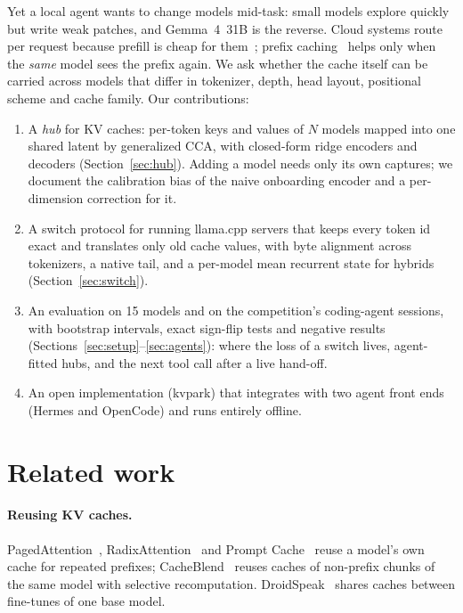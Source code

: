 \documentclass[11pt]{article}
\begin{document}
Yet a local agent wants to change models mid-task: small models explore quickly but write weak patches,
and Gemma~4~31B is the reverse. Cloud systems route per request because prefill is cheap for
them~\citep{chen2023frugalgpt,ong2024routellm}; prefix
caching~\citep{kwon2023vllm,zheng2024sglang,gim2024promptcache} helps only when the \emph{same} model sees
the prefix again. We ask whether the cache itself can be carried across models that differ in tokenizer,
depth, head layout, positional scheme and cache family. Our contributions:
\begin{enumerate}
\item A \emph{hub} for KV caches: per-token keys and values of $N$ models mapped into one
  shared latent by generalized CCA, with closed-form ridge encoders and decoders
  (Section~\ref{sec:hub}). Adding a model needs only its own captures; we document the
  calibration bias of the naive onboarding encoder and a per-dimension correction for it.
\item A switch protocol for running llama.cpp servers that keeps every token id exact and
  translates only old cache values, with byte alignment across tokenizers, a native tail, and a
  per-model mean recurrent state for hybrids (Section~\ref{sec:switch}).
\item An evaluation on 15 models and on the competition's coding-agent sessions, with bootstrap
  intervals, exact sign-flip tests and negative results (Sections~\ref{sec:setup}--\ref{sec:agents}): where the
  loss of a switch lives, agent-fitted hubs, and the next tool call after a live hand-off.
\item An open implementation (kvpark) that integrates with two agent front ends (Hermes and
  OpenCode) and runs entirely offline.
\end{enumerate}

\section{Related work}

\paragraph{Reusing KV caches.} PagedAttention~\citep{kwon2023vllm}, RadixAttention~\citep{zheng2024sglang}
and Prompt Cache~\citep{gim2024promptcache} reuse a model's own cache for repeated prefixes;
CacheBlend~\citep{yao2025cacheblend} reuses caches of non-prefix chunks of the same model with
selective recomputation. DroidSpeak~\citep{liu2024droidspeak} shares caches between fine-tunes of
one base model.
\end{document}
